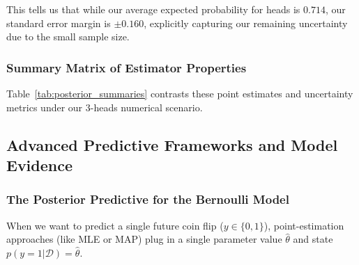 \documentclass{article}
\begin{document}
This tells us that while our average expected probability for heads is $0.714$, our standard error margin is $\pm 0.160$, explicitly capturing our remaining uncertainty due to the small sample size.

\subsubsection{Summary Matrix of Estimator Properties}
Table~\ref{tab:posterior_summaries} contrasts these point estimates and uncertainty metrics under our $3$-heads numerical scenario.

\begin{table}[htbp]
\centering
\small
\renewcommand{\arraystretch}{1.3}
\caption{Comparative Profile of Estimators Under Data Scarcity ($3$ Heads, $0$ Tails)}
\label{tab:posterior_summaries}
\end{table}

\subsection{Advanced Predictive Frameworks and Model Evidence}

\subsubsection{The Posterior Predictive for the Bernoulli Model}
When we want to predict a single future coin flip ($y \in \{0, 1\}$), point-estimation approaches (like MLE or MAP) plug in a single parameter value $\hat{\theta}$ and state $p(y=1|\mathcal{D}) = \hat{\theta}$. 
\end{document}
